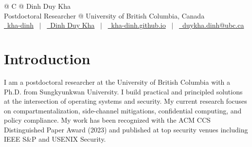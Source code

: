 \documentclass[a4paper,11pt]{article}
\begin{document}
\pagestyle{empty}



\begin{tabularx}{\linewidth}{@{} C @{}}
	\Huge{Dinh Duy Kha}                                              \\[7.5pt]
	Postdoctoral Researcher @ University of British Columbia, Canada \\
	\href{https://github.com/kha-dinh}{\raisebox{-0.05\height}\faGithub\ kha-dinh} \ $|$ \
	\href{https://linkedin.com/in/dinh-duy-kha-474b0912a/}{\raisebox{-0.05\height}\faLinkedin\ Dinh Duy Kha} \ $|$ \
	\href{https://kha-dinh.github.io}{\raisebox{-0.05\height}\faGlobe \ kha-dinh.github.io} \ $|$ \
	\href{mailto:duykha.dinh@ubc.ca}{\raisebox{-0.05\height}\faEnvelope \ duykha.dinh@ubc.ca}
\end{tabularx}



\section{Introduction}
I am a postdoctoral researcher at the University of British Columbia with a Ph.D. from Sungkyunkwan University.
I build practical and principled solutions at the intersection of operating systems and security.
My current research focuses on compartmentalization, side-channel mitigations, confidential computing, and policy compliance.
My work has been recognized with the ACM CCS Distinguished Paper Award (2023) and published at top security venues including IEEE S\&P and USENIX Security.
\end{document}
